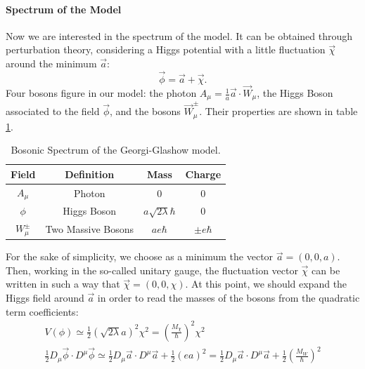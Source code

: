 \documentclass[main.tex]{subfiles}
\begin{document}
\paragraph{Spectrum of the Model}
Now we are interested in the spectrum of the model. It can be obtained through perturbation theory, considering a Higgs potential with a little fluctuation $\vec\chi$ around the minimum $\vec{a}$:
\begin{equation}
\vec{\phi} = \vec{a}+ \vec{\chi}. 
\end{equation} 
Four bosons figure in our model: the photon $A_{\mu} = \frac{1}{a} \vec{a}\cdot \vec{W}_\mu $, the Higgs Boson associated to the field $\vec{\phi}$, and the bosons $\vec{W}_\mu^\pm$. Their properties are shown in table \ref{tab:Bosons}.
\begin{table}[H]
\centering
\begin{tabular}{cc|cc}
\toprule
 Field  &   Definition   &  Mass  &  Charge \\
 \midrule
 $A_{\mu}$ &          Photon                   &  0                             &     0 \\
 $\phi $   &          Higgs Boson              &  $a \sqrt{2 \lambda} \hbar $   &     0 \\
$ W_{\mu}^{\pm} $&    Two Massive Bosons &  $ae\hbar$                     &    $ \pm e \hbar$ \\
 \bottomrule
\end{tabular}
\caption{Bosonic Spectrum of the Georgi-Glashow model.}
\label{tab:Bosons}
\end{table}
%
%
For the sake of simplicity, we choose as a minimum the vector $\vec{a}= (0,0,a)$. Then, working in the so-called unitary gauge, the fluctuation vector $\vec{\chi}$ can be written in such a way that $\vec{\chi} = (0,0,\chi) $.
At this point, we should expand the Higgs field around $\vec{a}$ in order to read the masses of the bosons from the quadratic term coefficients:
\begin{subequations}
 \begin{gather}
V(\phi)\simeq  \frac{1}{2}  \left(\sqrt{2 \lambda} a\right)^2 \chi^2 = \left( \frac{M_\chi}{\hbar }\right)^2 \chi^2 \\
 \frac{1}{2}D_{\mu}\vec{\phi} \cdot  D^\mu \vec{\phi} \simeq  \frac{1}{2}D_{\mu}\vec{a} \cdot  D^\mu \vec{a}  + \frac{1}{2} \left( ea \right)^2 =\frac{1}{2}D_{\mu}\vec{a} \cdot  D^\mu \vec{a}  + \frac{1}{2} \left( \frac{M_W}{\hbar} \right)^2
\end{gather}
\end{subequations}
\end{document}
